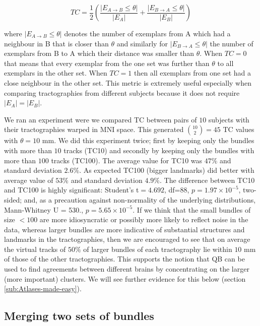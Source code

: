 \documentclass[preprint,authoryear,a4paper,10pt,onecolumn]{elsarticle}
\begin{document}
\begin{equation}
TC=\frac{1}{2}\left(\frac{|E_{A\rightarrow B}\leq \theta |}{|E_{A}|}+\frac{|E_{B\rightarrow A}\leq \theta |}{|E_{B}|}\right)\end{equation}


where $|E_{A\rightarrow B}\leq \theta |$ denotes the number of
exemplars from A which had a neighbour in B that is closer than
$\theta$ and similarly for $|E_{B\rightarrow A}\leq
\theta |$ the number of exemplars from B to A which their
distance was smaller than $\theta$. When $TC=0$ that means
that every exemplar from the one set was further than $\theta$
to all exemplars in the other set. When $TC=1$ then all exemplars from
one set had a close neighbour in the other set. This metric is extremely
useful especially when comparing tractographies from different subjects
because it does not require $|E_{A}|=|E_{B}|$.

We ran an experiment were we compared TC between pairs of $10$ subjects
with their tractographies warped in MNI space. This generated
$\binom{10}{2}=45$ TC values with $\theta=$$10$ mm. We did this
experiment twice; first by keeping only the bundles with more than $10$
tracks (TC10) and secondly by keeping only the bundles with more than
$100$ tracks (TC100). The average value for TC10 was $47\%$ and standard
deviation $2.6\%$. As expected TC100 (bigger landmarks) did better with
average value of $53\%$ and standard deviation $4.9\%$. The difference
between TC10 and TC100 is highly significant: Student's t$=4.692$,
df=88, $p=1.97\times10^{-5}$, two-sided; and, as a precaution against
non-normality of the underlying distributions, Mann-Whitney U = 530.,
$p=5.65\times10^{-5}$. If we think that the small bundles of size $<100$
are more idiosyncratic or possibly more likely to reflect noise in the
data, whereas larger bundles are more indicative of substantial
structures and landmarks in the tractographies, then we are encouraged
to see that on average the virtual tracks of $50\%$ of larger bundles of
each tractography lie within $10$ mm of those of the other
tractographies. This supports the notion that QB can be used to find
agreements between different brains by concentrating on the larger (more
important) clusters. We will see further evidence for this below
(section \ref{sub:Atlases-made-easy}).


\subsection{Merging two sets of bundles\label{sub:merging}}
\end{document}
